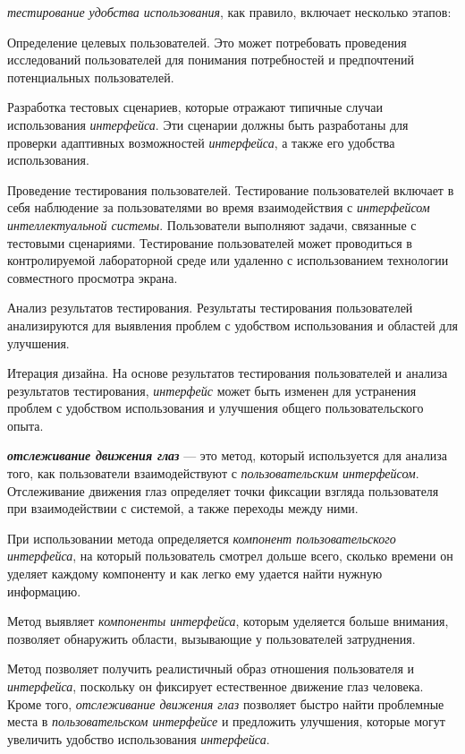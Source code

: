 \textit{тестирование удобства использования}, как правило, включает несколько этапов:

\begin{textitemize}
	\item Определение целевых пользователей. Это может потребовать проведения исследований пользователей для понимания потребностей и предпочтений потенциальных пользователей.
	\item Разработка тестовых сценариев, которые отражают типичные случаи использования \textit{интерфейса}. Эти сценарии должны быть разработаны для проверки адаптивных возможностей \textit{интерфейса}, а также его удобства использования.
	\item Проведение тестирования пользователей. Тестирование пользователей включает в себя наблюдение за пользователями во время взаимодействия с \textit{интерфейсом интеллектуальной системы}. Пользователи выполняют задачи, связанные с тестовыми сценариями. Тестирование пользователей может проводиться в контролируемой лабораторной среде или удаленно с использованием технологии совместного просмотра экрана.
	\item Анализ результатов тестирования. Результаты тестирования пользователей анализируются для выявления проблем с удобством использования и областей для улучшения.
	\item Итерация дизайна. На основе результатов тестирования пользователей и анализа результатов тестирования, \textit{интерфейс} может быть изменен для устранения проблем с удобством использования и улучшения общего пользовательского опыта.
\end{textitemize}


\textbf{\textit{отслеживание движения глаз}} --- это метод, который используется для анализа того, как пользователи взаимодействуют с \textit{пользовательским интерфейсом}. Отслеживание движения глаз определяет точки фиксации взгляда пользователя при взаимодействии с системой, а также переходы между ними. 

При использовании метода определяется \textit{компонент пользовательского интерфейса}, на который пользователь смотрел дольше всего, сколько времени он уделяет каждому компоненту и как легко ему удается найти нужную информацию.

Метод выявляет \textit{компоненты интерфейса}, которым уделяется больше внимания, позволяет обнаружить области, вызывающие у пользователей затруднения.

Метод позволяет получить реалистичный образ отношения пользователя и \textit{интерфейса}, поскольку он фиксирует естественное движение глаз человека. Кроме того, \textit{отслеживание движения глаз} позволяет быстро найти проблемные места в \textit{пользовательском интерфейсе} и предложить улучшения, которые могут увеличить удобство использования \textit{интерфейса}.


